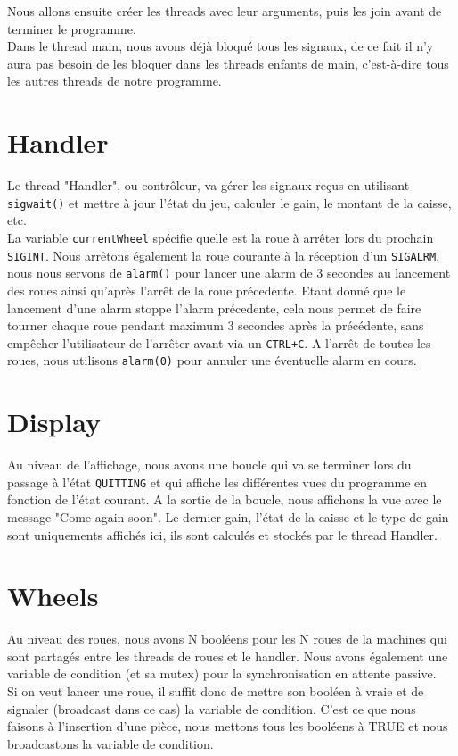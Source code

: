 \documentclass[a4paper]{article}
\begin{document}
Nous allons ensuite créer les threads avec leur arguments, puis les join avant de terminer le programme. \\

Dans le thread main, nous avons déjà bloqué tous les signaux, de ce fait il n'y aura pas besoin de les bloquer dans les threads enfants de main, c'est-à-dire tous les autres threads de notre programme.
\section{Handler}
Le thread "Handler", ou contrôleur, va gérer les signaux reçus en utilisant \verb+sigwait()+ et mettre à jour l'état du jeu, calculer le gain, le montant de la caisse, etc. \\

La variable \verb+currentWheel+ spécifie quelle est la roue à arrêter lors du prochain \verb+SIGINT+. Nous arrêtons également la roue courante à la réception d'un \verb+SIGALRM+, nous nous servons de \verb+alarm()+ pour lancer une alarm de 3 secondes au lancement des roues ainsi qu'après l'arrêt de la roue précedente. Etant donné que le lancement d'une alarm stoppe l'alarm précedente, cela nous permet de faire tourner chaque roue pendant maximum 3 secondes après la précédente, sans empêcher l'utilisateur de l'arrêter avant via un \verb-CTRL+C-. A l'arrêt de toutes les roues, nous utilisons \verb+alarm(0)+ pour annuler une éventuelle alarm en cours.
\section{Display}
Au niveau de l'affichage, nous avons une boucle qui va se terminer lors du passage à l'état \verb+QUITTING+ et qui affiche les différentes vues du programme en fonction de l'état courant. A la sortie de la boucle, nous affichons la vue avec le message "Come again soon". Le dernier gain, l'état de la caisse et le type de gain sont uniquements affichés ici, ils sont calculés et stockés par le thread Handler.
\section{Wheels}
Au niveau des roues, nous avons N booléens pour les N roues de la machines qui sont partagés entre les threads de roues et le handler. Nous avons également une variable de condition (et sa mutex) pour la synchronisation en attente passive. \\

Si on veut lancer une roue, il suffit donc de mettre son booléen à vraie et de signaler (broadcast dans ce cas) la variable de condition. C'est ce que nous faisons à l'insertion d'une pièce, nous mettons tous les booléens à TRUE et nous broadcastons la variable de condition. \\
\end{document}
